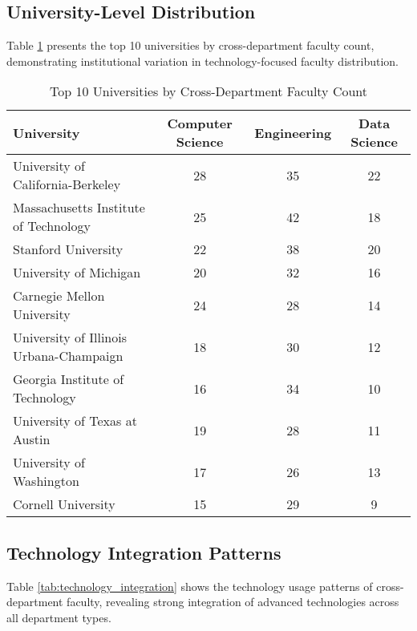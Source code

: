 \documentclass[12pt]{article}
\begin{document}
\subsection{University-Level Distribution}

Table \ref{tab:university_distribution} presents the top 10 universities by cross-department faculty count, demonstrating institutional variation in technology-focused faculty distribution.

\begin{table}[h]
\centering
\caption{Top 10 Universities by Cross-Department Faculty Count}
\label{tab:university_distribution}
\begin{tabular}{lccc}
\toprule
\textbf{University} & \textbf{Computer Science} & \textbf{Engineering} & \textbf{Data Science} \\
\midrule
University of California-Berkeley & 28 & 35 & 22 \\
Massachusetts Institute of Technology & 25 & 42 & 18 \\
Stanford University & 22 & 38 & 20 \\
University of Michigan & 20 & 32 & 16 \\
Carnegie Mellon University & 24 & 28 & 14 \\
University of Illinois Urbana-Champaign & 18 & 30 & 12 \\
Georgia Institute of Technology & 16 & 34 & 10 \\
University of Texas at Austin & 19 & 28 & 11 \\
University of Washington & 17 & 26 & 13 \\
Cornell University & 15 & 29 & 9 \\
\bottomrule
\end{tabular}
\end{table}

\subsection{Technology Integration Patterns}

Table \ref{tab:technology_integration} shows the technology usage patterns of cross-department faculty, revealing strong integration of advanced technologies across all department types.
\end{document}
